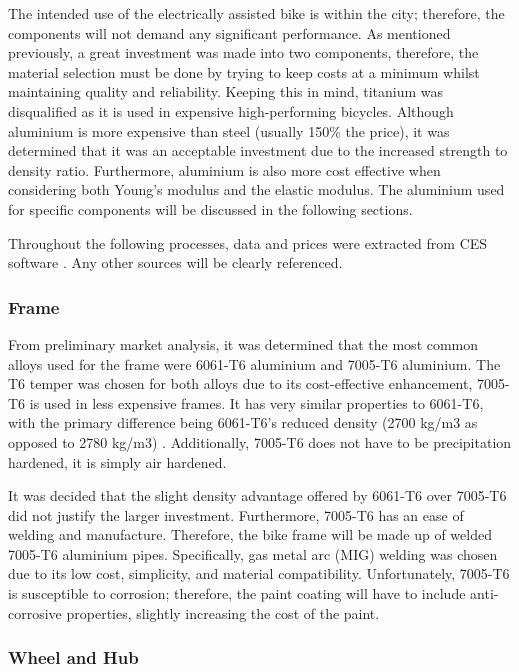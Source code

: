 \documentclass[a4paper,11pt]{article}
\begin{document}
The intended use of the electrically assisted bike is within the city; therefore, the components will not demand any significant performance. As mentioned previously, a great investment was made into two components, therefore, the material selection must be done by trying to keep costs at a minimum whilst maintaining quality and reliability. Keeping this in mind, titanium was disqualified as it is used in expensive high-performing bicycles. Although aluminium is more expensive than steel (usually 150\% the price), it was determined that it was an acceptable investment due to the increased strength to density ratio. Furthermore, aluminium is also more cost effective when considering both Young's modulus and the elastic modulus. The aluminium used for specific components will be discussed in the following sections. 

Throughout the following processes, data and prices were extracted from CES software \cite{CES}. Any other sources will be clearly referenced. 

\subsubsection{Frame}

From preliminary market analysis, it was determined that the most common alloys used for the frame were 6061-T6 aluminium and 7005-T6 aluminium. The T6 temper was chosen for both alloys due to its cost-effective enhancement, 7005-T6 is used in less expensive frames. It has very similar properties to 6061-T6, with the primary difference being 6061-T6's reduced density (2700 kg/m3 as opposed to 2780 kg/m3) \cite{mif}.  Additionally, 7005-T6 does not have to be precipitation hardened, it is simply air hardened. 

It was decided that the slight density advantage offered by 6061-T6 over 7005-T6 did not justify the larger investment. Furthermore, 7005-T6 has an ease of welding and manufacture. Therefore, the bike frame will be made up of welded 7005-T6 aluminium pipes. Specifically, gas metal arc (MIG) welding was chosen due to its low cost, simplicity, and material compatibility. Unfortunately, 7005-T6 is susceptible to corrosion; therefore, the paint coating will have to include anti-corrosive properties, slightly increasing the cost of the paint. 

\subsubsection{Wheel and Hub}
\end{document}
